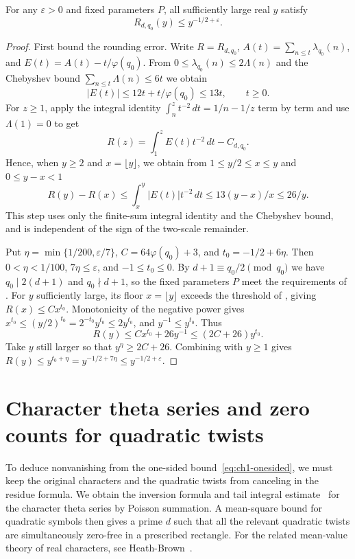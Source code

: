 \begin{theorem}
\label{thm:one-sided}
\emitthmsource
For any $\varepsilon>0$ and fixed parameters $P$, all sufficiently large real $y$ satisfy
\begin{equation}
 R_{d,q_0}(y)\le y^{-1/2+\varepsilon}.
\label{eq:ch1-onesided}
\end{equation}
\end{theorem}
\begin{proof}
First bound the rounding error. Write $R=R_{d,q_0}$, $A(t)=\sum_{n\le t}\lambda_{q_0}(n)$, and $E(t)=A(t)-t/\varphi(q_0)$. From $0\le\lambda_{q_0}(n)\le2\Lambda(n)$ and the Chebyshev bound $\sum_{n\le t}\Lambda(n)\le6t$ we obtain
\[
 |E(t)|\le 12t+t/\varphi(q_0)\le13t,\qquad t\ge0.
\]
For $z\ge1$, apply the integral identity $\int_n^z t^{-2}\,dt=1/n-1/z$ term by term and use $\Lambda(1)=0$ to get
\[
 R(z)=\int_1^z E(t)t^{-2}\,dt-C_{d,q_0}.
\]
Hence, when $y\ge2$ and $x=\lfloor y\rfloor$, we obtain from $1\le y/2\le x\le y$ and $0\le y-x<1$
\[
 R(y)-R(x)
   \le \int_x^y |E(t)|t^{-2}\,dt
   \le 13(y-x)/x\le26/y.
\]
This step uses only the finite-sum integral identity and the Chebyshev bound, and is independent of the sign of the two-scale remainder.

Put $\eta=\min\{1/200,\varepsilon/7\}$, $C=64\varphi(q_0)+3$, and $t_0=-1/2+6\eta$. Then $0<\eta<1/100$, $7\eta\le\varepsilon$, and $-1\le t_0\le0$. By $d+1\equiv q_0/2\pmod{q_0}$ we have $q_0\mid2(d+1)$ and $q_0\nmid d+1$, so the fixed parameters $P$ meet the requirements of . For $y$ sufficiently large, its floor $x=\lfloor y\rfloor$ exceeds the threshold of , giving $R(x)\le Cx^{t_0}$. Monotonicity of the negative power gives $x^{t_0}\le(y/2)^{t_0}=2^{-t_0}y^{t_0}\le2y^{t_0}$, and $y^{-1}\le y^{t_0}$. Thus
\[
 R(y)\le Cx^{t_0}+26y^{-1}\le (2C+26)y^{t_0}.
\]
Take $y$ still larger so that $y^\eta\ge2C+26$. Combining with $y\ge1$ gives $R(y)\le y^{t_0+\eta}=y^{-1/2+7\eta}\le y^{-1/2+\varepsilon}$.
\end{proof}

\section{Character theta series and zero counts for quadratic twists}
\label{sec:twist-density}

To deduce nonvanishing from the one-sided bound~\eqref{eq:ch1-onesided}, we must keep the original characters and the quadratic twists from canceling in the residue formula. We obtain the inversion formula and tail integral estimate~\cite{Davenport2000,MontgomeryVaughan2007} for the character theta series by Poisson summation. A mean-square bound for quadratic symbols then gives a prime $d$ such that all the relevant quadratic twists are simultaneously zero-free in a prescribed rectangle. For the related mean-value theory of real characters, see Heath-Brown~\cite{HeathBrown1995}.

